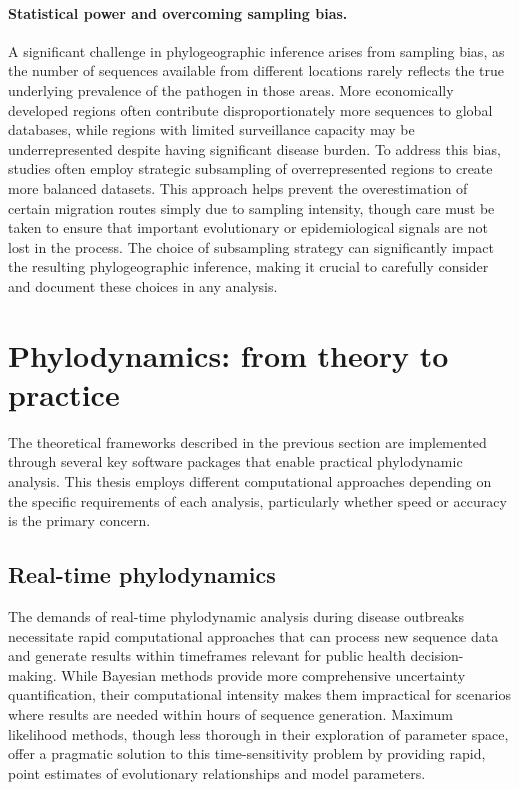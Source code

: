 \paragraph*{Statistical power and overcoming sampling bias.}
A significant challenge in phylogeographic inference arises from sampling bias, as the number of sequences available from different locations rarely reflects the true underlying prevalence of the pathogen in those areas.
More economically developed regions often contribute disproportionately more sequences to global databases, while regions with limited surveillance capacity may be underrepresented despite having significant disease burden.
To address this bias, studies often employ strategic subsampling of overrepresented regions to create more balanced datasets.
This approach helps prevent the overestimation of certain migration routes simply due to sampling intensity, though care must be taken to ensure that important evolutionary or epidemiological signals are not lost in the process.
The choice of subsampling strategy can significantly impact the resulting phylogeographic inference, making it crucial to carefully consider and document these choices in any analysis.

\section{Phylodynamics: from theory to practice}
The theoretical frameworks described in the previous section are implemented through several key software packages that enable practical phylodynamic analysis.
This thesis employs different computational approaches depending on the specific requirements of each analysis, particularly whether speed or accuracy is the primary concern.

\subsection{Real-time phylodynamics}
The demands of real-time phylodynamic analysis during disease outbreaks necessitate rapid computational approaches that can process new sequence data and generate results within timeframes relevant for public health decision-making.
While Bayesian methods provide more comprehensive uncertainty quantification, their computational intensity makes them impractical for scenarios where results are needed within hours of sequence generation.
Maximum likelihood methods, though less thorough in their exploration of parameter space, offer a pragmatic solution to this time-sensitivity problem by providing rapid, point estimates of evolutionary relationships and model parameters.

